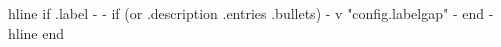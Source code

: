 {{hline}}
{{ if .label -}}
{{- if (or .description .entries .bullets) -}}
{{ v "config.labelgap" }}
{{- end -}}
\\ {{hline}}
{{ end }}